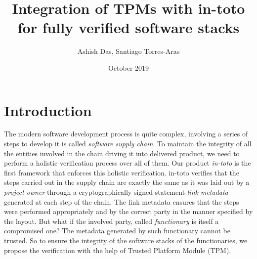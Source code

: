 \documentclass{article}
\title{Integration of TPMs with in-toto for fully verified software stacks}
\author{Ashish Das, Santiago Torres-Aras}
\date{October 2019}
\begin{document}
\maketitle

\section{Introduction}
The modern software development process is quite complex, involving a series of steps to develop it is called \textit{software supply chain}. To maintain the integrity of all the entities involved in the chain driving it into delivered product, we need to perform a holistic verification process over all of them. Our product \textit{in-toto} is the first framework that enforces this holistic verification. in-toto verifies that the steps carried out in the supply chain are exactly the same as it was laid out by a \textit{project owner} through a cryptographically signed statement \textit{link metadata} generated at each step of the chain. The link metadata ensures that the steps were performed appropriately and by the correct party in the manner specified by the layout. But what if the involved party, called \textit{functionary} is itself a compromised one? The metadata generated by such functionary cannot be trusted. So to ensure the integrity of the software stacks of the functionaries, we propose the verification with the help of Trusted Platform Module (TPM).
\end{document}
